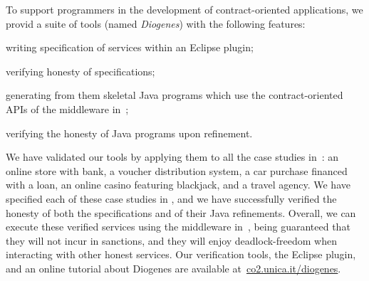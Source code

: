To support programmers in the development of contract-oriented 
applications, we provid a suite of tools (named \emph{Diogenes}) 
with the following features:
\begin{inlinelist}
\item writing \coco specification of services within an Eclipse plugin;
\item verifying honesty of \coco specifications;
\item generating from them skeletal Java programs which
use the contract-oriented APIs of the middleware in~\cite{CO2middleware}; %
\item verifying the honesty of Java programs upon refinement.
\end{inlinelist}
We have validated our tools by applying them to
all the case studies in~\cite{BMSZ15jlamp}:
an online store with bank,
a voucher distribution system,
a car purchase financed with a loan,
an online casino featuring blackjack,
and a travel agency.
We have specified each of these case studies in \coco,
and we have successfully verified the honesty of 
both the specifications and of their Java refinements.
Overall, we can execute these verified services 
using the middleware in~\cite{CO2middleware},
being guaranteed that they will not incur in sanctions,
and they will enjoy deadlock-freedom when interacting 
with other honest services.
Our verification tools, the Eclipse plugin, and an online tutorial about Diogenes
are available at~\url{co2.unica.it/diogenes}.








\endinput 
In \coco we formalize services 
as processes that can advertise contracts with the $\tell{}{}$ primitive,
and realize them with the $\fact{}{}$ primitive. %

